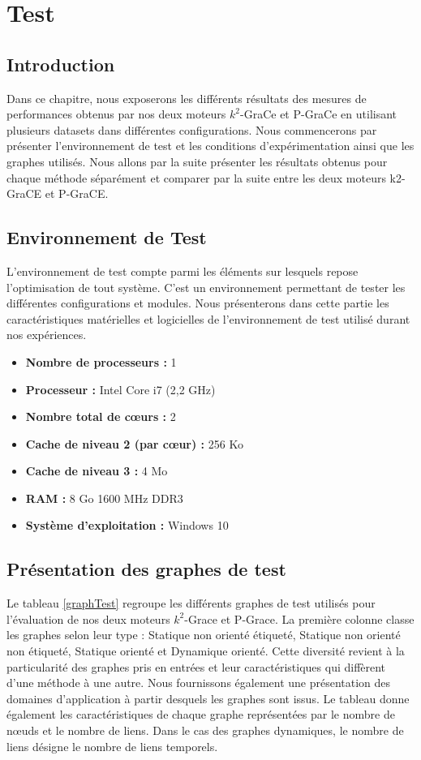 \chapter{Test}
	\section{Introduction}
	
Dans ce chapitre, nous exposerons les différents résultats des mesures de performances obtenus par nos deux moteurs $k^2$-GraCe et P-GraCe en utilisant plusieurs datasets dans différentes configurations. Nous commencerons par présenter l'environnement de test et les conditions d'expérimentation ainsi que les graphes utilisés. Nous allons par la suite présenter les résultats obtenus pour chaque méthode séparément et comparer par la suite entre les deux moteurs k2-GraCE et P-GraCE. 


	
	
	\section{Environnement de Test}
	L'environnement de test compte parmi les éléments sur lesquels repose l'optimisation de tout système. C'est un environnement permettant de tester les différentes configurations et modules. Nous présenterons dans cette partie les caractéristiques matérielles et logicielles de l'environnement de test utilisé durant nos expériences. 

	
	\begin{itemize}[label=$\bullet$]
		\item \textbf{Nombre de processeurs :}	1
		\item \textbf{Processeur :} Intel Core i7 (2,2 GHz)
  		\item \textbf{Nombre total de cœurs :}	2
  		\item \textbf{Cache de niveau 2 (par cœur) :}	256 Ko
  		\item \textbf{Cache de niveau 3 :}	4 Mo
		\item \textbf{RAM : } 8 Go 1600 MHz DDR3
		\item \textbf{Système d'exploitation : } Windows 10
	\end{itemize}
	\section{Présentation des graphes de test}
	Le tableau \ref{graphTest} regroupe les différents graphes de test utilisés pour l'évaluation de nos deux moteurs $k^2$-Grace et P-Grace. La première colonne classe les graphes selon leur type : Statique non orienté étiqueté, Statique non orienté non étiqueté, Statique  orienté et Dynamique orienté. Cette diversité revient à la particularité des graphes pris en entrées et leur caractéristiques qui diffèrent d'une méthode à une autre.
Nous fournissons également une présentation des domaines d'application à partir desquels  les graphes sont issus. Le tableau donne également les caractéristiques de chaque graphe représentées par le nombre de nœuds et le nombre de liens. Dans le cas des graphes dynamiques, le nombre de liens désigne le nombre de liens temporels.
	 


